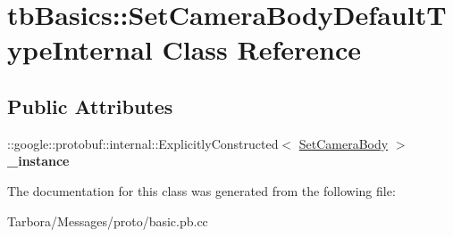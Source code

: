 \hypertarget{classtbBasics_1_1SetCameraBodyDefaultTypeInternal}{}\section{tb\+Basics\+:\+:Set\+Camera\+Body\+Default\+Type\+Internal Class Reference}
\label{classtbBasics_1_1SetCameraBodyDefaultTypeInternal}
\subsection*{Public Attributes}
\begin{DoxyCompactItemize}
\item 
\mbox{\label{classtbBasics_1_1SetCameraBodyDefaultTypeInternal_a3bbfba22ccf1ed34a4c7c988bea54f83}} 
\+::google\+::protobuf\+::internal\+::\+Explicitly\+Constructed$<$ \hyperlink{classtbBasics_1_1SetCameraBody}{Set\+Camera\+Body} $>$ {\bfseries \+\_\+instance}
\end{DoxyCompactItemize}


The documentation for this class was generated from the following file\+:\begin{DoxyCompactItemize}
\item 
Tarbora/\+Messages/proto/basic.\+pb.\+cc\end{DoxyCompactItemize}
